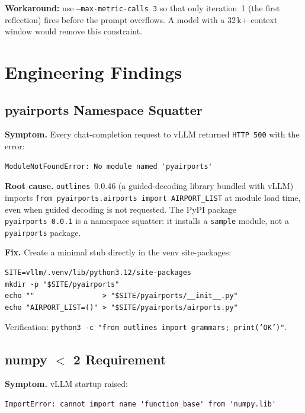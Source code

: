 \documentclass[11pt,a4paper]{article}
\begin{document}
\medskip
\noindent\textbf{Workaround:} use \texttt{--max-metric-calls 3} so that only
iteration~1 (the first reflection) fires before the prompt overflows.
A model with a 32\,k$+$ context window would remove this constraint.

\section{Engineering Findings}
\label{sec:engineering}

\subsection{pyairports Namespace Squatter}
\label{sec:pyairports}

\textbf{Symptom.} Every chat-completion request to vLLM returned
\texttt{HTTP 500} with the error:
\begin{lstlisting}[style=shell]
ModuleNotFoundError: No module named 'pyairports'
\end{lstlisting}

\textbf{Root cause.}
\texttt{outlines}~0.0.46 (a guided-decoding library bundled with vLLM) imports
\texttt{from pyairports.airports import AIRPORT\_LIST} at module load time,
even when guided decoding is not requested.
The PyPI package \texttt{pyairports~0.0.1} is a namespace squatter: it
installs a \texttt{sample} module, not a \texttt{pyairports} package.

\textbf{Fix.} Create a minimal stub directly in the venv site-packages:

\begin{lstlisting}[style=shell]
SITE=vllm/.venv/lib/python3.12/site-packages
mkdir -p "$SITE/pyairports"
echo ""                > "$SITE/pyairports/__init__.py"
echo "AIRPORT_LIST=()" > "$SITE/pyairports/airports.py"
\end{lstlisting}

Verification: \texttt{python3 -c "from outlines import grammars; print('OK')"}.

\subsection{numpy $<$ 2 Requirement}
\label{sec:numpy}

\textbf{Symptom.} vLLM startup raised:
\begin{lstlisting}[style=shell]
ImportError: cannot import name 'function_base' from 'numpy.lib'
\end{lstlisting}
\end{document}
